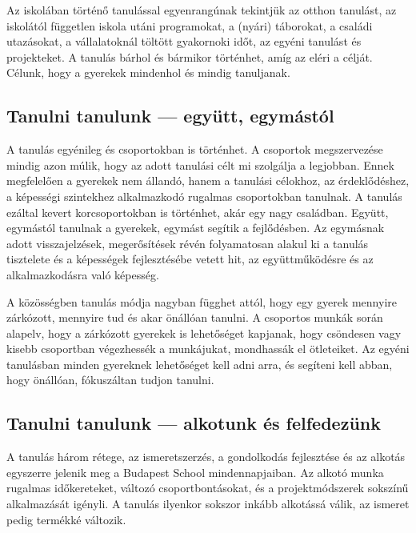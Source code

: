 Az iskolában történő tanulással egyenrangúnak tekintjük az otthon\break
tanulást, az iskolától független iskola utáni programokat, a (nyári)
táborokat, a családi utazásokat, a vállalatoknál töltött gyakornoki
időt, az egyéni tanulást és projekteket. A tanulás bárhol és bármikor
történhet, amíg az eléri a célját. Célunk, hogy a gyerekek mindenhol és
mindig tanuljanak.

\hypertarget{tanulni-tanulunk-egyutt-egymastol}{%
\subsection{Tanulni tanulunk --- együtt,
egymástól}\label{tanulni-tanulunk-egyutt-egymastol}}

A tanulás egyénileg és csoportokban is történhet. A csoportok
megszervezése mindig azon múlik, hogy az adott tanulási célt mi
szolgálja a legjobban. Ennek megfelelően a gyerekek nem állandó, hanem a
tanulási célokhoz, az érdeklődéshez, a képességi szintekhez alkalmazkodó
rugalmas csoportokban tanulnak. A tanulás ezáltal kevert korcsoportokban
is történhet, akár egy nagy családban. Együtt, egymástól tanulnak a
gyerekek, egymást segítik a fejlődésben. Az egymásnak adott
visszajelzések, megerősítések révén folyamatosan alakul ki a tanulás
tisztelete és a képességek fejlesztésébe vetett hit, az együttműködésre
és az alkalmazkodásra való képesség.

A közösségben tanulás módja nagyban függhet attól, hogy egy gyerek
mennyire zárkózott, mennyire tud és akar önállóan tanulni. A csoportos
munkák során alapelv, hogy a zárkózott gyerekek is lehetőséget kapjanak,
hogy csöndesen vagy kisebb csoportban végezhessék a munkájukat,
mondhassák el ötleteiket. Az egyéni tanulásban minden gyereknek
lehetőséget kell adni arra, és segíteni kell abban, hogy önállóan,
fókuszáltan tudjon tanulni.

\hypertarget{tanulni-tanulunk-alkotunk-es-felfedezunk}{%
\subsection{Tanulni tanulunk --- alkotunk és
felfedezünk}\label{tanulni-tanulunk-alkotunk-es-felfedezunk}}

A tanulás három rétege, az ismeretszerzés, a gondolkodás fejlesztése és
az alkotás egyszerre jelenik meg a Budapest School mindennapjaiban. Az
alkotó munka rugalmas időkereteket, változó csoportbontásokat, és a
projektmódszerek sokszínű alkalmazását igényli. A tanulás ilyenkor
sokszor inkább alkotássá válik, az ismeret pedig termékké változik.

